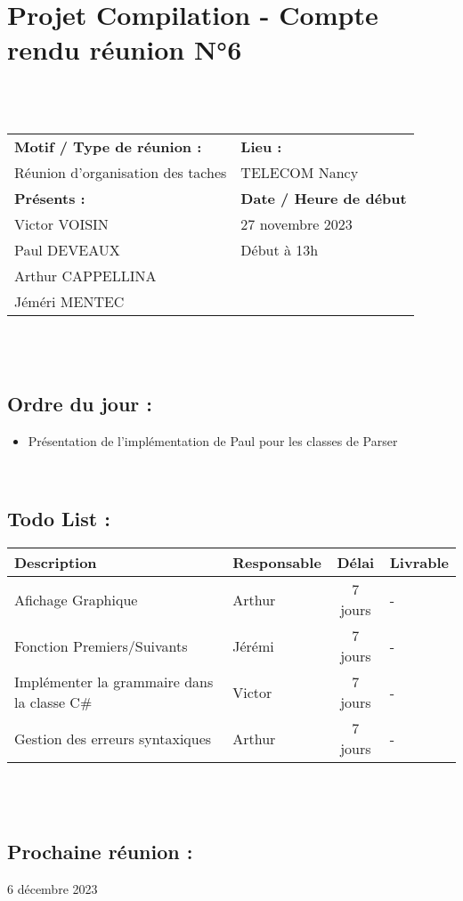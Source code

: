 \documentclass{article}
\begin{document}
\section*{Projet Compilation - Compte rendu réunion N°6}
~\\\\

\begin{tabular}{|p{7cm}|p{6cm}|}
    \hline
    \textbf{Motif / Type de réunion :}
    & \textbf{Lieu :}
    \\
    Réunion d'organisation des taches
    &
    TELECOM Nancy
    \\ \hline
    \textbf{Présents :}
    &
    \textbf{Date / Heure de début}
    \\
    Victor VOISIN &  27 novembre 2023\\
    Paul DEVEAUX & Début à 13h\\
    Arthur CAPPELLINA & \\
    Jéméri MENTEC &
    \\ \hline
\end{tabular}
\\\\

\subsection*{Ordre du jour :}
\begin{itemize}
    \item{Présentation de l'implémentation de Paul pour les classes de Parser}
\end{itemize}
~

\subsection*{Todo List :}
\renewcommand{\arraystretch}{1.5}
\begin{tabular}{|p{5cm}|l|c|p{4.5cm}|}
    \hline
    Description & Responsable & Délai & Livrable\\ 
    \hline
    Afichage Graphique & Arthur  & 7 jours & - \\
    Fonction Premiers/Suivants & Jérémi  & 7 jours & - \\
    Implémenter la grammaire dans la classe C# & Victor & 7 jours & - \\
    Gestion des erreurs syntaxiques & Arthur  & 7 jours & - \\
    \hline
\end{tabular}
\\\\

\subsection*{Prochaine réunion :} 6 décembre 2023
\end{document}
